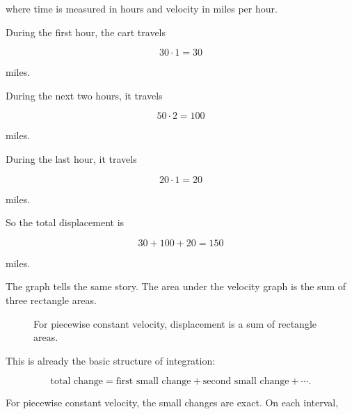 where time is measured in hours and velocity in miles per hour.

During the first hour, the cart travels

\[
30\cdot1=30
\]

miles.

During the next two hours, it travels

\[
50\cdot2=100
\]

miles.

During the last hour, it travels

\[
20\cdot1=20
\]

miles.

So the total displacement is

\[
30+100+20=150
\]

miles.

The graph tells the same story.  The area under the velocity graph is the sum of three
rectangle areas.

\begin{figure}[h]
\centering
{}
\caption{For piecewise constant velocity, displacement is a sum of rectangle areas.}
\label{fig:piecewise-constant-velocity}
\end{figure}

This is already the basic structure of integration:

\[
\text{total change}
=
\text{first small change}
+
\text{second small change}
+
\cdots.
\]

For piecewise constant velocity, the small changes are exact.  On each interval,

